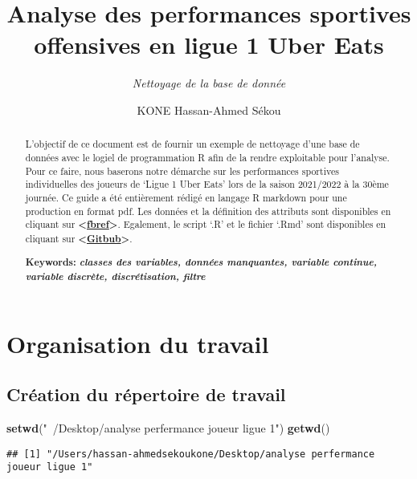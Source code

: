 \documentclass[7pt,]{report}
\title{\textbf{Analyse des performances sportives offensives en ligue 1 Uber Eats}}
\subtitle{\emph{Nettoyage de la base de donnée}}
\author{KONE Hassan-Ahmed Sékou}
\date{}
\newenvironment{Shaded}{\begin{snugshade}}{\end{snugshade}}
\newcommand{\KeywordTok}[1]{\textcolor[rgb]{0.13,0.29,0.53}{\textbf{#1}}}
\newcommand{\NormalTok}[1]{#1}
\newcommand{\StringTok}[1]{\textcolor[rgb]{0.31,0.60,0.02}{#1}}
\begin{document}
\maketitle
\begin{abstract}
L'objectif de ce document est de fournir un exemple de nettoyage d'une base de données avec le logiel de programmation R afin de la rendre exploitable pour l'analyse. Pour ce faire, nous baserons notre démarche sur les performances sportives individuelles des joueurs de `Ligue 1 Uber Eats' lors de la saison 2021/2022 à la 30ème journée. Ce guide a été entièrement rédigé en langage R markdown pour une production en format pdf. Les données et la définition des attributs sont disponibles en cliquant sur \textbf{\textless{}\href{https://fbref.com/fr/?lang=fr}{fbref}\textgreater{}}. Egalement, le script `.R' et le fichier `.Rmd' sont disponibles en cliquant sur \textbf{\textless{}\href{https://github.com/konehassan92}{Gitbub}\textgreater{}}.

\par

\textbf{Keywords:} \textbf{\emph{classes des variables, données manquantes, variable continue, variable discrète, discrétisation, filtre}}~
\end{abstract}

{
\setcounter{tocdepth}{4}
\tableofcontents
}
\hypertarget{organisation-du-travail}{%
\chapter{Organisation du travail}\label{organisation-du-travail}}

\hypertarget{cruxe9ation-du-ruxe9pertoire-de-travail}{%
\section{Création du répertoire de travail}\label{cruxe9ation-du-ruxe9pertoire-de-travail}}

\begin{Shaded}
\begin{Highlighting}[]
\KeywordTok{setwd}\NormalTok{(}\StringTok{"~/Desktop/analyse perfermance joueur ligue 1"}\NormalTok{)}
\KeywordTok{getwd}\NormalTok{()}
\end{Highlighting}
\end{Shaded}

\begin{verbatim}
## [1] "/Users/hassan-ahmedsekoukone/Desktop/analyse perfermance joueur ligue 1"
\end{verbatim}
\end{document}
